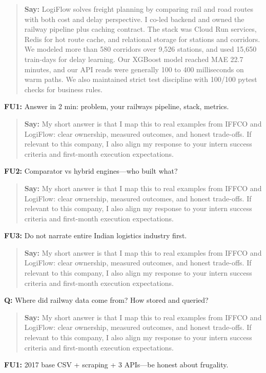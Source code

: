 \documentclass[9pt,a4paper]{article}
\begin{document}
\begin{quote}\small\textbf{Say:} LogiFlow solves freight planning by comparing rail and road routes with both cost and delay perspective. I co-led backend and owned the railway pipeline plus caching contract. The stack was Cloud Run services, Redis for hot route cache, and relational storage for stations and corridors. We modeled more than 580 corridors over 9,526 stations, and used 15,650 train-days for delay learning. Our XGBoost model reached MAE 22.7 minutes, and our API reads were generally 100 to 400 milliseconds on warm paths. We also maintained strict test discipline with 100/100 pytest checks for business rules.\end{quote}
\vspace{2mm}
\textbf{FU1:} Answer in 2 min: problem, your railways pipeline, stack, metrics.

\begin{quote}\small\textbf{Say:} My short answer is that I map this to real examples from IFFCO and LogiFlow: clear ownership, measured outcomes, and honest trade-offs. If relevant to this company, I also align my response to your intern success criteria and first-month execution expectations.\end{quote}
\vspace{2mm}
\textbf{FU2:} Comparator vs hybrid engines---who built what?

\begin{quote}\small\textbf{Say:} My short answer is that I map this to real examples from IFFCO and LogiFlow: clear ownership, measured outcomes, and honest trade-offs. If relevant to this company, I also align my response to your intern success criteria and first-month execution expectations.\end{quote}
\vspace{2mm}
\textbf{FU3:} Do not narrate entire Indian logistics industry first.

\begin{quote}\small\textbf{Say:} My short answer is that I map this to real examples from IFFCO and LogiFlow: clear ownership, measured outcomes, and honest trade-offs. If relevant to this company, I also align my response to your intern success criteria and first-month execution expectations.\end{quote}
\vspace{2mm}
\textbf{Q:} Where did railway data come from? How stored and queried?

\begin{quote}\small\textbf{Say:} My short answer is that I map this to real examples from IFFCO and LogiFlow: clear ownership, measured outcomes, and honest trade-offs. If relevant to this company, I also align my response to your intern success criteria and first-month execution expectations.\end{quote}
\vspace{2mm}
\textbf{FU1:} 2017 base CSV + scraping + 3 APIs---be honest about frugality.
\end{document}
